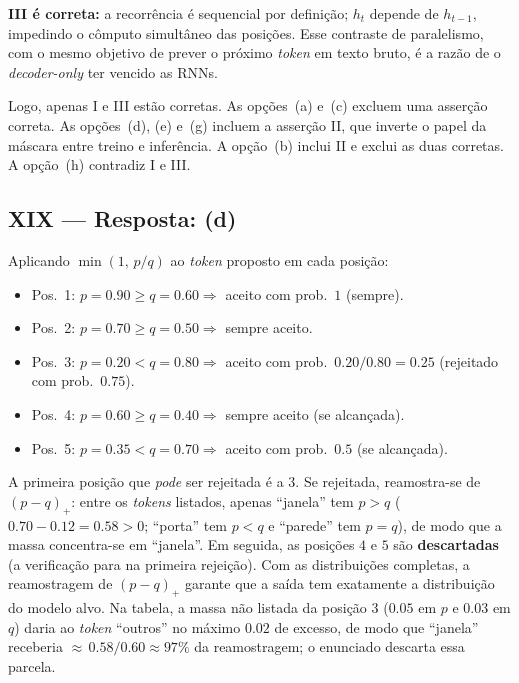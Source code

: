 \documentclass{dlproblemset}
\begin{document}
\textbf{III é correta:} a recorrência é sequencial por definição; $h_t$ depende de
$h_{t-1}$, impedindo o cômputo simultâneo das posições. Esse contraste de paralelismo,
com o mesmo objetivo de prever o próximo \textit{token} em texto bruto, é a razão
de o \textit{decoder-only} ter vencido as RNNs.

Logo, apenas I e III estão corretas.
As opções~(a) e~(c) excluem uma asserção correta.
As opções~(d), (e) e~(g) incluem a asserção II, que inverte o papel da máscara entre
treino e inferência.
A opção~(b) inclui II e exclui as duas corretas.
A opção~(h) contradiz I e III.

\subsection*{XIX — Resposta: (d)}
Aplicando $\min(1,\, p/q)$ ao \textit{token} proposto em cada posição:
\begin{itemize}
    \item Pos.\ 1: $p = 0.90 \ge q = 0.60 \Rightarrow$ aceito com prob.\ $1$ (sempre).
    \item Pos.\ 2: $p = 0.70 \ge q = 0.50 \Rightarrow$ sempre aceito.
    \item Pos.\ 3: $p = 0.20 < q = 0.80 \Rightarrow$ aceito com prob.\ $0.20/0.80 = 0.25$ (rejeitado com prob.\ $0.75$).
    \item Pos.\ 4: $p = 0.60 \ge q = 0.40 \Rightarrow$ sempre aceito (se alcançada).
    \item Pos.\ 5: $p = 0.35 < q = 0.70 \Rightarrow$ aceito com prob.\ $0.5$ (se alcançada).
\end{itemize}
A primeira posição que \emph{pode} ser rejeitada é a $3$. Se rejeitada, reamostra-se de
$(p-q)_+$: entre os \textit{tokens} listados, apenas ``janela'' tem $p > q$
($0.70 - 0.12 = 0.58 > 0$; ``porta'' tem $p < q$ e ``parede'' tem $p = q$), de modo que
a massa concentra-se em ``janela''. Em seguida, as posições $4$ e $5$ são
\textbf{descartadas} (a verificação para na primeira rejeição). Com as distribuições completas, a reamostragem de $(p-q)_+$ garante que a saída tem
exatamente a distribuição do modelo alvo. Na tabela, a massa não listada da posição $3$
($0.05$ em $p$ e $0.03$ em $q$) daria ao \textit{token} ``outros'' no máximo $0.02$ de
excesso, de modo que ``janela'' receberia ${\approx}\,0.58/0.60 \approx 97\%$ da
reamostragem; o enunciado descarta essa parcela.
\end{document}
